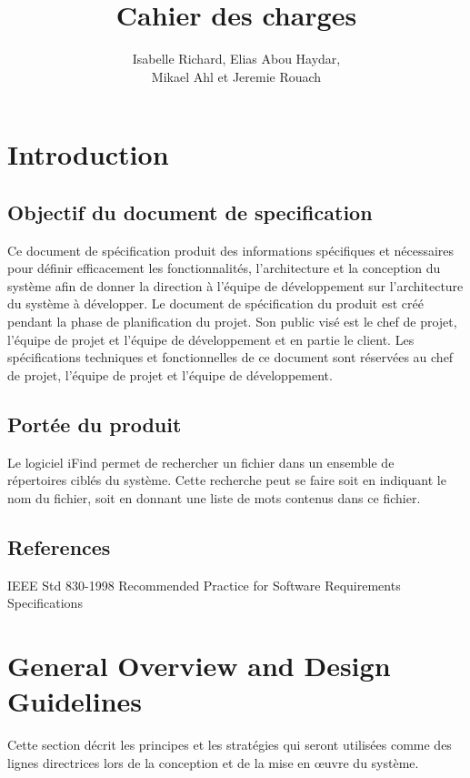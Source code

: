 \documentclass[a4paper,10pt]{article}
\title{Cahier des charges}
\author{Isabelle Richard, Elias Abou Haydar, \\Mikael Ahl et Jeremie Rouach}
\begin{document}
\maketitle

\tableofcontents
\newpage



\section{Introduction}

\subsection{Objectif du document de specification} 
Ce document de spécification produit des informations spécifiques et nécessaires
pour définir efficacement les fonctionnalités, l'architecture et la conception
du système afin de donner la direction à l'équipe de développement sur
l'architecture du système à développer. Le document de spécification du produit
est créé pendant la phase de planification du projet. Son public visé est le
chef de projet, l'équipe de projet et l'équipe de développement et en partie le
client. Les spécifications techniques et fonctionnelles de ce document sont
réservées au chef de projet, l'équipe de projet et l'équipe de développement.


\subsection{Portée du produit}
Le logiciel iFind permet de rechercher un fichier dans un ensemble de\\
répertoires ciblés du système. Cette recherche peut se faire soit en indiquant
le nom du fichier, soit en donnant une liste de mots contenus dans ce fichier.




\subsection{References}
IEEE Std 830-1998 Recommended Practice for Software Requirements Specifications 

\newpage



\section{General Overview and Design Guidelines}
Cette section décrit les principes et les stratégies qui seront utilisées comme
des lignes directrices lors de la conception et de la mise en œuvre du système.
\end{document}
